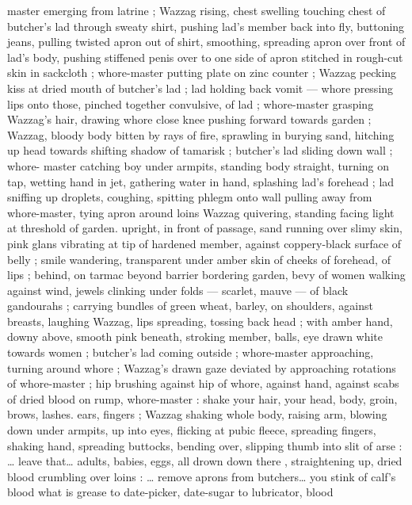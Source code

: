 master emerging from latrine ; Wazzag rising, chest swelling 
touching chest of butcher's lad through sweaty shirt, pushing lad's 
member back into fly, buttoning jeans, pulling twisted apron out of 
shirt, smoothing, spreading apron over front of lad's body, pushing 
stiffened penis over to one side of apron stitched in rough-cut skin 
in sackcloth ; whore-master putting plate on zinc counter ; Wazzag 
pecking kiss at dried mouth of butcher's lad ; lad holding back vomit 
--- whore pressing lips onto those, pinched together convulsive, of 
lad ; whore-master grasping Wazzag's hair, drawing whore close 
knee pushing forward towards garden ; Wazzag, bloody body bitten 
by rays of fire, sprawling in burying sand, hitching up head towards 
shifting shadow of tamarisk ; butcher's lad sliding down wall ; whore- 
master catching boy under armpits, standing body straight, turning 
on tap, wetting hand in jet, gathering water in hand, splashing lad's 
forehead ; lad sniffing up droplets, coughing, spitting phlegm onto 
wall pulling away from whore-master, tying apron around loins 
Wazzag quivering, standing facing light at threshold of garden. 
upright, in front of passage, sand running over slimy skin, pink glans 
vibrating at tip of hardened member, against coppery-black surface 
of belly ; smile wandering, transparent under amber skin of cheeks 
of forehead, of lips ; behind, on tarmac beyond barrier bordering 
garden, bevy of women walking against wind, jewels clinking under 
folds --- scarlet, mauve --- of black gandourahs ; carrying bundles 
of green wheat, barley, on shoulders, against breasts, laughing 
Wazzag, lips spreading, tossing back head ; with amber hand, downy 
above, smooth pink beneath, stroking member, balls, eye drawn 
white towards women ; butcher's lad coming outside ; whore-master 
approaching, turning around whore ; Wazzag's drawn gaze deviated 
by approaching rotations of whore-master ; hip brushing against hip 
of whore, against hand, against scabs of dried blood on rump, 
whore-master :{\td} {\gl} {\td} shake your hair, your head, body, groin, brows, 
lashes. ears, fingers{\td} {\gr} ; Wazzag shaking whole body, raising arm, 
blowing down under armpits, up into eyes, flicking at pubic fleece, 
spreading fingers, shaking hand, spreading buttocks, bending over, 
slipping thumb into slit of arse : {\gl}{\ldots} leave that{\ldots} adults, babies, eggs, 
all drown down there{\td} {\gr}, straightening up, dried blood crumbling 
over loins : {\gl}{\ldots} remove aprons from butchers{\ldots} you stink of calf's 
blood{\td} what is grease to date-picker, date-sugar to lubricator, blood 
